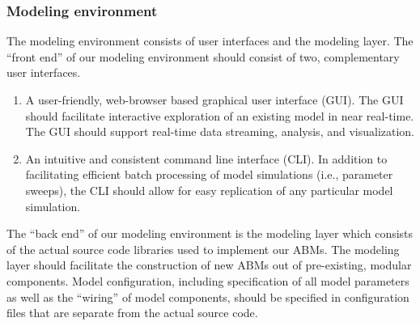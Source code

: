 \documentclass[11pt]{amsart}
\begin{document}
\subsubsection{Modeling environment}
The modeling environment consists of user interfaces and the modeling layer. The ``front end'' of our modeling environment should consist of two, complementary user interfaces.
\begin{enumerate}
    \item A user-friendly, web-browser based graphical user interface (GUI). The GUI should facilitate interactive exploration of an existing model in near real-time.  The GUI should support real-time data streaming, analysis, and visualization.
    \item An intuitive and consistent command line interface (CLI). In addition to facilitating efficient batch processing of model simulations (i.e., parameter sweeps), the CLI should allow for easy replication of any particular model simulation.
\end{enumerate}
The ``back end'' of our modeling environment is the modeling layer which consists of the actual source code libraries used to implement our ABMs. The modeling layer should facilitate the construction of new ABMs out of pre-existing, modular components.  Model configuration, including specification of all model parameters as well as the ``wiring'' of model components, should be specified in configuration files that are separate from the actual source code. 
\end{document}
